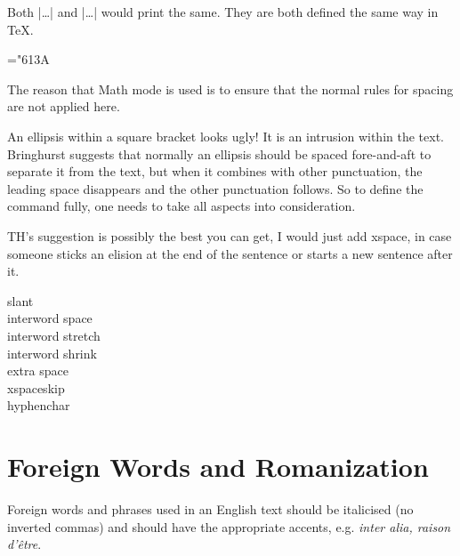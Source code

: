Both |\dots| and |\ldots| would print the same. They are both defined the same way in \TeX .

\begin{teX}
 \mathchardef\ldotp="613A %
 \def\ldots{\mathinner{\ldotp\ldotp\ldotp}}
 \def\dots{\relax\ifmmode\ldots\else$\m@th\ldots\,$\fi}
\end{teX}

The reason that Math mode is used is to ensure that the normal rules for spacing are not applied here.

An ellipsis within a square bracket looks ugly! It is an intrusion within the text. Bringhurst suggests that normally an ellipsis should be spaced fore-and-aft to separate it from the text, but when it combines with other punctuation, the leading space disappears and the other punctuation follows. So to define the command fully, one needs to take all aspects into consideration.

TH's suggestion is possibly the best you can get, I would just add xspace, in case someone sticks an elision at the end of the sentence or starts a new sentence  after it.

\begin{teX}
 \newcommand*\elide{\textup{[\,\dots]\xspace}
\end{teX}

\begin{description}
  \item[slant] \the{}\font
  \item[interword space] \the{}\font
  \item[interword stretch] \the{}\font
  \item[interword shrink] \the{}\font
  \item[extra space] \the{}\font
  \item[xspaceskip] \the\xspaceskip
  \item[hyphenchar] \the\hyphenchar\font
\end{description}

\section{Foreign Words and Romanization}

Foreign words and phrases used in an English text should be italicised (no
inverted commas) and should have the appropriate accents, e.g. \textit{inter alia,
raison d'\^{e}tre}.

